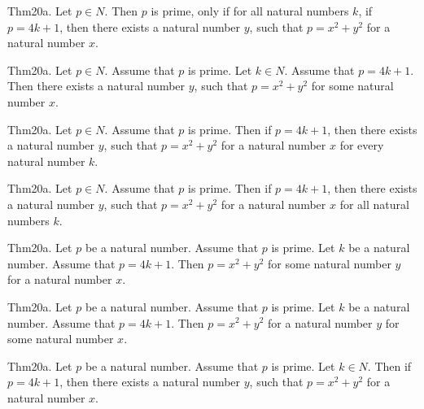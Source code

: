 \documentclass{article}
\begin{document}
Thm20a. Let $p \in N$. Then $p$ is prime, only if for all natural numbers $k$, if $p = 4 k + 1$, then there exists a natural number $y$, such that $p = x ^{ 2}+ y ^{ 2}$ for a natural number $x$.

Thm20a. Let $p \in N$. Assume that $p$ is prime. Let $k \in N$. Assume that $p = 4 k + 1$. Then there exists a natural number $y$, such that $p = x ^{ 2}+ y ^{ 2}$ for some natural number $x$.

Thm20a. Let $p \in N$. Assume that $p$ is prime. Then if $p = 4 k + 1$, then there exists a natural number $y$, such that $p = x ^{ 2}+ y ^{ 2}$ for a natural number $x$ for every natural number $k$.

Thm20a. Let $p \in N$. Assume that $p$ is prime. Then if $p = 4 k + 1$, then there exists a natural number $y$, such that $p = x ^{ 2}+ y ^{ 2}$ for a natural number $x$ for all natural numbers $k$.

Thm20a. Let $p$ be a natural number. Assume that $p$ is prime. Let $k$ be a natural number. Assume that $p = 4 k + 1$. Then $p = x ^{ 2}+ y ^{ 2}$ for some natural number $y$ for a natural number $x$.

Thm20a. Let $p$ be a natural number. Assume that $p$ is prime. Let $k$ be a natural number. Assume that $p = 4 k + 1$. Then $p = x ^{ 2}+ y ^{ 2}$ for a natural number $y$ for some natural number $x$.

Thm20a. Let $p$ be a natural number. Assume that $p$ is prime. Let $k \in N$. Then if $p = 4 k + 1$, then there exists a natural number $y$, such that $p = x ^{ 2}+ y ^{ 2}$ for a natural number $x$.
\end{document}
